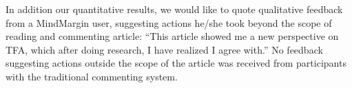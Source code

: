 In addition our quantitative results, we would like to quote qualitative feedback from a MindMargin user, suggesting actions he/she took beyond the scope of reading and commenting article: “This article showed me a new perspective on TFA, which after doing research, I have realized I agree with.” No feedback suggesting actions outside the scope of the article was received from participants with the traditional commenting system. 